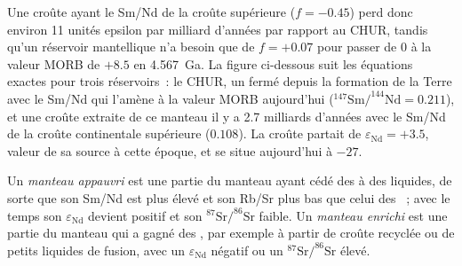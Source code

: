 Une croûte ayant le Sm/Nd de la croûte supérieure ($f = -0.45$) perd donc environ
11 unités epsilon par milliard d'années par rapport au CHUR, tandis qu'un réservoir mantellique
n'a besoin que de $f = +0.07$ pour passer de 0 à la valeur MORB de $+8.5$ en
\qty{4.567}{Ga}. La figure ci-dessous suit les équations exactes pour trois
réservoirs~: le CHUR, un  fermé depuis la formation de la Terre avec le Sm/Nd
qui l'amène à la valeur MORB aujourd'hui ($^{147}\mathrm{Sm}/^{144}\mathrm{Nd} =
0.211$), et une croûte extraite de ce manteau il y a 2.7 milliards d'années avec le Sm/Nd de la
croûte continentale supérieure ($0.108$). La croûte partait de $\varepsilon_{\mathrm{Nd}} =
+3.5$, valeur de sa source à cette époque, et se situe aujourd'hui à $-27$.

\begin{definition}\label{def:b2:isotope-geochemistry:reservoirs}
Un \emph{manteau appauvri} est une partie du manteau
ayant cédé des  à des liquides, de sorte que son Sm/Nd est plus élevé et son Rb/Sr
plus bas que celui des ~; avec le temps son $\varepsilon_{\mathrm{Nd}}$ devient positif et
son $^{87}\mathrm{Sr}/^{86}\mathrm{Sr}$ faible. Un \emph{manteau
enrichi} est une partie du manteau qui a gagné
des , par exemple à partir de croûte recyclée ou de petits liquides de fusion,
avec un $\varepsilon_{\mathrm{Nd}}$ négatif ou un $^{87}\mathrm{Sr}/^{86}\mathrm{Sr}$ élevé.
\end{definition}

